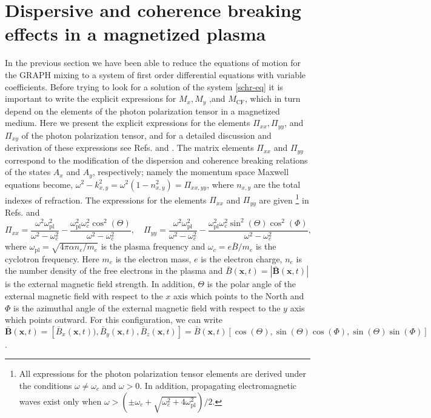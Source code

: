 \documentclass[a4paper,11pt]{article}
\newcommand{\bs}{\boldsymbol}
\begin{document}
 \section{Dispersive and coherence breaking effects in a magnetized plasma}
 \label{sec:3}
 
 
 In the previous section we have been able to reduce the equations of motion for the GRAPH mixing to a system of first order differential equations with variable coefficients. Before trying to look for a solution of the system \eqref{schr-eq} it is important to write the explicit expressions for $M_x, M_y$ ,and $M_\text{CF}$, which in turn depend on the elements of the photon polarization tensor in a magnetized medium. Here we present the explicit expressions for the elements $\Pi_{xx}, \Pi_{yy}$, and $\Pi_{xy}$ of the photon polarization tensor, and for a detailed discussion and derivation of these expressions see Refs. \cite{Ejlli:2016asd} and \cite{Ejlli:2018ucq}. The matrix elements $\Pi_{xx}$ and $\Pi_{yy}$ correspond to the modification of the dispersion and coherence breaking relations of the states $A_x$ and $A_y$, respectively; namely the momentum space Maxwell equations become, $\omega^2-k_{x, y}^2=\omega^2(1-n_{x, y}^2)=\Pi_{xx, yy}$, where $n_{x, y}$ are the total indexes of refraction. The expressions for the elements $\Pi_{xx}$ and $\Pi_{yy}$ are given \footnote{All expressions for the photon polarization tensor elements are derived under the conditions $\omega\neq \omega_c$ and $\omega>0$. In addition, propagating electromagnetic waves exist only when $\omega > \left(\pm \omega_c+\sqrt{\omega_c^2+4 \omega_\text{pl}^2}\right)/2$.} in Refs. \cite{Ejlli:2016asd} and \cite{Ejlli:2018ucq}
  \begin{equation}\label{pol-ele}
\Pi_{xx}=\frac{\omega^2 \omega_\text{pl}^2}{\omega^2-\omega_c^2} - \frac{\omega_\text{pl}^2\omega_c^2 \cos^2(\Theta)}{\omega^2-\omega_c^2}, \quad \Pi_{yy}=\frac{\omega^2\omega_\text{pl}^2}{\omega^2-\omega_c^2} - \frac{\omega_\text{pl}^2\omega_c^2 \sin^2(\Theta)\cos^2(\Phi)}{\omega^2-\omega_c^2},
\end{equation}
where $\omega_\text{pl}=\sqrt{4\pi\alpha n_e/m_e}$ is the plasma frequency and $\omega_c=e \bar B/m_e$ is the cyclotron frequency. Here $m_e$ is the electron mass, $e$ is the electron charge, $n_e$ is the number density of the free electrons in the plasma and $\bar B(\bs x, t)=|\bar{\bs B}(\bs x, t)|$ is the external magnetic field strength. In addition, $\Theta$ is the polar angle of the external magnetic field with respect to the $x$ axis which points to the North and $\Phi$ is the azimuthal angle of the external magnetic field with respect to the $y$ axis which points outward. For this configuration, we can write $\bar{\bs B}(\bs x, t)=[\bar B_x (\bs x, t)), \bar B_y (\bs x, t), \bar B_z (\bs x, t)]=\bar B (\bs x, t)\left[ \cos(\Theta), \sin(\Theta)\cos(\Phi), \sin(\Theta)\sin(\Phi)\right]$.
\end{document}
